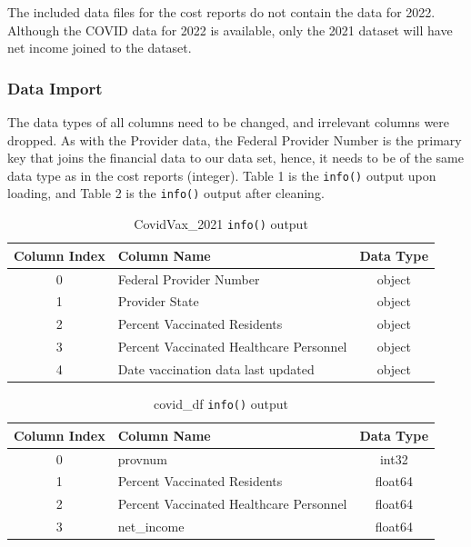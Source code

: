 \documentclass{article}
\theoremstyle{mytheoremstyle}
\theoremstyle{mytheoremstyle}
\theoremstyle{myproblemstyle}
\begin{document}
The included data files for the cost reports do not contain the data for 2022. Although the COVID data for 2022 is available, only the 2021 dataset will have net income joined to the dataset. 

\subsubsection{Data Import}
The data types of all columns need to be changed, and irrelevant columns were dropped. As with the Provider data, the Federal Provider Number is the primary key that joins the financial data to our data set, hence, it needs to be of the same data type as in the cost reports (integer). Table 1 is the \texttt{info()} output upon loading, and Table 2 is the \texttt{info()} output after cleaning. 
\begin{table}[h]
\centering
\caption{CovidVax\_2021 \texttt{info()} output}
\label{tab:dataframe_structure}
\begin{tabular}{|c|l|c|}
\hline
\textbf{Column Index} & \textbf{Column Name}                               & \textbf{Data Type} \\ \hline
0                     & Federal Provider Number                            & object             \\ \hline
1                     & Provider State                                     & object             \\ \hline
2                     & Percent Vaccinated Residents                       & object             \\ \hline
3                     & Percent Vaccinated Healthcare Personnel            & object             \\ \hline
4                     & Date vaccination data last updated                 & object             \\ \hline
\end{tabular}
\end{table}


\begin{table}[h]
\centering
\caption{covid\_df \texttt{info()} output}
\label{tab:new_dataframe_structure}
\begin{tabular}{|c|l|c|}
\hline
\textbf{Column Index} & \textbf{Column Name}                               & \textbf{Data Type} \\ \hline
0                     & provnum                                            & int32              \\ \hline
1                     & Percent Vaccinated Residents                       & float64            \\ \hline
2                     & Percent Vaccinated Healthcare Personnel            & float64            \\ \hline
3                     & net\_income                                        & float64            \\ \hline
\end{tabular}
\end{table}
\end{document}
